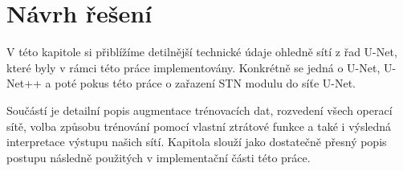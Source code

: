 \chapter{Návrh řešení}
\label{sec:Chapter4}
V této kapitole si přiblížíme detilnější technické údaje ohledně sítí z řad U-Net, které byly v rámci této práce implementovány. Konkrétně se jedná o U-Net, U-Net++ a poté pokus této práce o zařazení STN modulu do síťe U-Net.

Součástí je detailní popis augmentace trénovacích dat, rozvedení všech operací sítě, volba způsobu trénování pomocí vlastní ztrátové funkce a také i výsledná interpretace výstupu našich sítí. Kapitola slouží jako dostatečně přesný popis postupu následně použitých v implementační části této práce.
\endinput